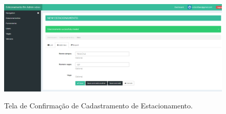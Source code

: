 \begin{figure}[h]
	\caption{Tela de Confirmação de Cadastramento de Estacionamento.}
	
	\centering %
	\includegraphics[scale=0.45]{Figs/cadastroEstacionamentoCreated.png} %
	\label{figura:cadastroEstacionamentoCreated}
\end{figure}
